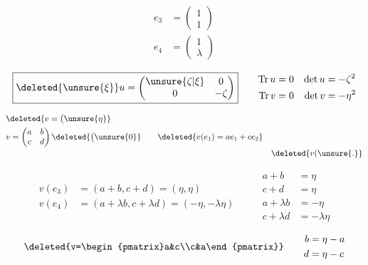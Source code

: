 
\[
\begin{aligned}e_3&=\begin{pmatrix}1\\1\end{pmatrix}\\e_4&=\begin{pmatrix}1\\\lambda\end{pmatrix}\end{aligned}
\]

\[
\boxed{\deleted{\unsure{\xi}}u=\begin{pmatrix}\unsure{\zeta|\xi}&0\\0&-\zeta\end{pmatrix}}
\qquad\begin{aligned}\operatorname{Tr}u&=0&\det u&=-\zeta^2\\\operatorname{Tr}v&=0&\det v&=-\eta^2\end{aligned}
\]

\[
\begin{aligned}
&\deleted{v=\bigl(\unsure{\eta}}\\
&v=\begin{pmatrix}a&b\\c&d\end{pmatrix}\deleted{\bigl(\unsure{0}}\qquad\deleted{v(e_1)=ae_1+ce_2}\\[-2pt]
&&\deleted{v(\unsure{.}}
\end{aligned}
\]

\[
\begin{aligned}
v(e_3)&=(a+b,c+d)=(\eta,\eta)\\
v(e_4)&=(a+\lambda b,c+\lambda d)=(-\eta,-\lambda\eta)
\end{aligned}
\qquad
\begin{aligned}a+b&=\eta\\c+d&=\eta\\a+\lambda b&=-\eta\\c+\lambda d&=-\lambda\eta\end{aligned}
\]

\[
\deleted{v=\begin{pmatrix}a&c\\c&a\end{pmatrix}}\qquad
\begin{aligned}b&=\eta-a\\d&=\eta-c\end{aligned}
\]

